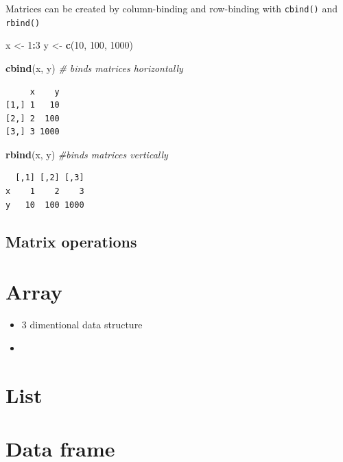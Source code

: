 \documentclass[
]{book}
\newenvironment{Shaded}{\begin{snugshade}}{\end{snugshade}}
\newcommand{\CommentTok}[1]{\textcolor[rgb]{0.56,0.35,0.01}{\textit{#1}}}
\newcommand{\DecValTok}[1]{\textcolor[rgb]{0.00,0.00,0.81}{#1}}
\newcommand{\KeywordTok}[1]{\textcolor[rgb]{0.13,0.29,0.53}{\textbf{#1}}}
\newcommand{\NormalTok}[1]{#1}
\newcommand{\OperatorTok}[1]{\textcolor[rgb]{0.81,0.36,0.00}{\textbf{#1}}}
\newcommand{\StringTok}[1]{\textcolor[rgb]{0.31,0.60,0.02}{#1}}
\begin{document}
Matrices can be created by column-binding and row-binding with \texttt{cbind()} and \texttt{rbind()}

\begin{Shaded}
\begin{Highlighting}[]
\NormalTok{x <-}\StringTok{ }\DecValTok{1}\OperatorTok{:}\DecValTok{3}
\NormalTok{y <-}\StringTok{ }\KeywordTok{c}\NormalTok{(}\DecValTok{10}\NormalTok{, }\DecValTok{100}\NormalTok{, }\DecValTok{1000}\NormalTok{)}

\KeywordTok{cbind}\NormalTok{(x, y) }\CommentTok{# binds matrices horizontally}
\end{Highlighting}
\end{Shaded}

\begin{verbatim}
     x    y
[1,] 1   10
[2,] 2  100
[3,] 3 1000
\end{verbatim}

\begin{Shaded}
\begin{Highlighting}[]
\KeywordTok{rbind}\NormalTok{(x, y) }\CommentTok{#binds matrices vertically}
\end{Highlighting}
\end{Shaded}

\begin{verbatim}
  [,1] [,2] [,3]
x    1    2    3
y   10  100 1000
\end{verbatim}

\hypertarget{matrix-operations}{%
\subsection{Matrix operations}\label{matrix-operations}}

\hypertarget{array}{%
\section{Array}\label{array}}

\begin{itemize}
\item
  3 dimentional data structure
\item
\end{itemize}

\hypertarget{list}{%
\section{List}\label{list}}

\hypertarget{data-frame}{%
\section{Data frame}\label{data-frame}}
\end{document}
